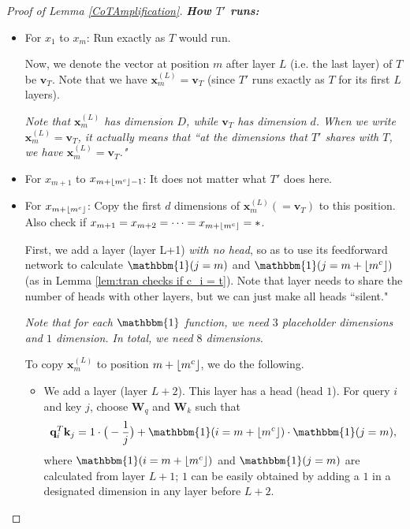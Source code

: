 \documentclass{article}
\theoremstyle{definition}
\DeclarePairedDelimiter{\floor}{\lfloor}{\rfloor}
\newcommand{\x}{\mathbf{x}}
\newcommand{\q}{\mathbf{q}}
\renewcommand{\k}{\mathbf{k}}
\renewcommand{\v}{\mathbf{v}}
\newcommand{\W}{\mathbf{W}}
\newcommand{\0}{\mathbf{0}}
\newcommand{\1}{\mathbbm{1}}
\begin{document}
\begin{proof}[Proof of Lemma \ref{CoTAmplification}]
{\bf \em How $T'$ runs: } 
    \begin{itemize}[noitemsep, leftmargin=10pt, topsep=0pt]
        \item For $x_1$ to $x_m$: Run exactly as $T$ would run.

        Now, we denote the vector at position $m$ after layer $L$ (i.e. the last layer) of $T$ be $\v_T$. Note that we have $\x_m^{(L)} = \v_T$ (since $T'$ runs exactly as $T$ for its first $L$ layers). 

        \textit{Note that $\x_m^{(L)}$ has dimension $D$, while $\v_T$ has dimension $d$. When we write $\x_m^{(L)} = \v_T$, it actually means that ``at the dimensions that $T'$ shares with $T$, we have $\x_m^{(L)} = \v_T$."}

        \item  For $x_{m+1}$ to $x_{m + \floor{m^c} -1}$: It does not matter what $T'$ does here.  
        
        \item For $x_{m + \floor{m^c}}$: Copy the first $d$ dimensions of $\x_m^{(L)} (=\v_T)$ to this position. Also check if $x_{m+1} = x_{m+2} = \dots = x_{m+\floor{m^c}} = *$. 

        First, we add a layer (layer L+1) \textit{with no head}, so as to use its feedforward network to calculate $\1(j = m)$ and $\1(j = m + \floor{m^c})$ (as in Lemma \ref{lem:tran checks if c_i = t}). Note that layer needs to share the number of heads with other layers, but we can just make all heads ``silent."
        
        \textit{Note that for each $\1$ function, we need $3$ placeholder dimensions and $1$ dimension. In total, we need $8$ dimensions.} 

        To copy $\x_m^{(L)}$ to position $m + \floor{m^c}$, we do the following.
        \begin{itemize}[noitemsep, leftmargin=10pt, topsep=0pt]
            \item We add a layer (layer $L+2$). This layer has a head (head $1$). For query $i$ and key $j$, choose $\W_q$ and $\W_k$ such that 
            \begin{equation*}
                \q_i^T \k_j = 1 \cdot \big(-\frac{1}{j}\big) + \1(i = m + \floor{m^c}) \cdot \1(j = m), 
            \end{equation*}
            where $\1(i = m + \floor{m^c})$ and $\1(j = m)$ are calculated from layer $L+1$; $1$ can be easily obtained by adding a $1$ in a designated dimension in any layer before $L+2$. 
            

\end{itemize}
\end{itemize}
\end{proof}
\end{document}
